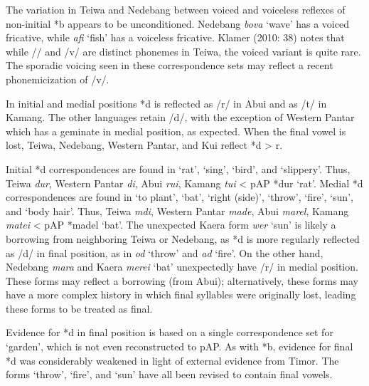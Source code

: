 The variation in Teiwa and Nedebang between voiced and voiceless reflexes of non-initial *b appears to be unconditioned. Nedebang \textit{bova }{\textquoteleft}wave{\textquoteright} has a voiced fricative, while \textit{a{\textlengthmark}fi} {\textquoteleft}fish{\textquoteright} has a voiceless fricative. Klamer (2010: 38) notes that while /{\textphi}/ and /v/ are distinct phonemes in Teiwa, the voiced variant is quite rare. The sporadic voicing seen in these correspondence sets may reflect a recent phonemicization of /v/. 

In initial and medial positions *d is reflected as /r/ in Abui and as /t/ in Kamang. The other languages retain /d/, with the exception of Western Pantar which has a geminate in medial position, as expected. When the final vowel is lost, Teiwa, Nedebang, Western Pantar, and Kui reflect *d {\textgreater} r. 

Initial *d correspondences are found in {\textquoteleft}rat{\textquoteright}, {\textquoteleft}sing{\textquoteright}, {\textquoteleft}bird{\textquoteright}, and {\textquoteleft}slippery{\textquoteright}. Thus, Teiwa \textit{dur}, Western Pantar \textit{di}, Abui \textit{rui}, Kamang \textit{tui} {\textless} pAP *dur\textit{ }{\textquoteleft}rat{\textquoteright}. Medial *d correspondences are found in {\textquoteleft}to plant{\textquoteright}, {\textquoteleft}bat{\textquoteright}, {\textquoteleft}right (side){\textquoteright}, {\textquoteleft}throw{\textquoteright}, {\textquoteleft}fire{\textquoteright}, {\textquoteleft}sun{\textquoteright}, and {\textquoteleft}body hair{\textquoteright}. Thus, Teiwa \textit{m{\textschwa}di}, Western Pantar \textit{mad{\textlengthmark}e}, Abui \textit{marel}, Kamang \textit{matei} {\textless} pAP *madel\textit{ }{\textquoteleft}bat{\textquoteright}. The unexpected Kaera form \textit{wer }{\textquoteleft}sun{\textquoteright} is likely a borrowing from neighboring Teiwa or 
Nedebang, as *d is more regularly reflected as /d/ in final position, as in \textit{od }{\textquoteleft}throw{\textquoteright} and \textit{ad }{\textquoteleft}fire{\textquoteright}. On the other hand, Nedebang \textit{mara }and Kaera \textit{merei} {\textquoteleft}bat{\textquoteright} unexpectedly have /r/ in medial position. These forms may reflect a borrowing (from Abui); alternatively, these forms may have a more complex history in which final syllables were originally lost, leading these forms to be treated as final. 

Evidence for *d in final position is based on a single correspondence set for {\textquoteleft}garden{\textquoteright}, which is not even reconstructed to pAP. As with *b, evidence for final *d was considerably weakened in light of external evidence from Timor. The forms {\textquoteleft}throw{\textquoteright}, {\textquoteleft}fire{\textquoteright}, and {\textquoteleft}sun{\textquoteright} have all been revised to contain final vowels. 


